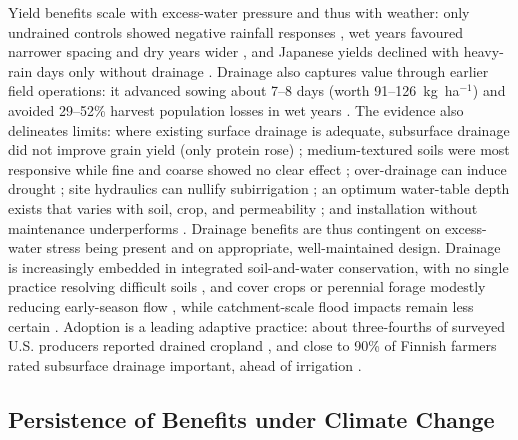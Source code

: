 \documentclass[11pt]{article}
\begin{document}
Yield benefits scale with excess-water pressure and thus with weather: only
undrained controls showed negative rainfall responses
\parencite{Rui2024,JORJANI1991}, wet years favoured narrower spacing and dry years
wider \parencite{Kladivko2005,Acharya2019,CAMP1982,Cordeiro2015}, and Japanese
yields declined with heavy-rain days only without drainage \parencite{Takeshima2023}.
Drainage also captures value through earlier field operations: it advanced sowing
about 7--8 days (worth 91--126~kg~ha$^{-1}$) \parencite{Mourtzinis2021} and avoided
29--52\% harvest population losses in wet years \parencite{Nelson2011}. The
evidence also delineates limits: where existing surface drainage is adequate,
subsurface drainage did not improve grain yield (only protein rose)
\parencite{Wiersma2010}; medium-textured soils were most responsive while fine and
coarse showed no clear effect \parencite{Singh2022b}; over-drainage can induce
drought \parencite{Cordeiro2015,DeBoer2006}; site hydraulics can nullify
subirrigation \parencite{Gunn2018,Gunn2019}; an optimum water-table depth exists
that varies with soil, crop, and permeability
\parencite{HOOGHOUDT1952,Bigelow2001}; and installation without maintenance
underperforms \parencite{Malota2016}. Drainage benefits are thus contingent on
excess-water stress being present and on appropriate, well-maintained design.
Drainage is increasingly embedded in integrated soil-and-water conservation, with
no single practice resolving difficult soils
\parencite{GARDNER1992,Manik2019,Li2021b,Rui2024}, and cover crops or perennial
forage modestly reducing early-season flow \parencite{Goeken2015,Daigh2014}, while
catchment-scale flood impacts remain less certain \parencite{Rogger2017}. Adoption
is a leading adaptive practice: about three-fourths of surveyed U.S. producers
reported drained cropland \parencite{Morton2015}, and close to 90\% of Finnish
farmers rated subsurface drainage important, ahead of irrigation
\parencite{PeltonenSainio2021}.

\subsection{Persistence of Benefits under Climate Change}
\end{document}

